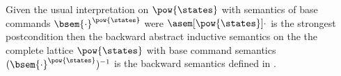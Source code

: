 Given the usual interpretation on $\pow{\states}$ with semantics of base 
commands $\bsem{\cdot}^{\pow{\states}}$ were $\asem[\pow{\states}]{\cdot}$ is the 
strongest postcondition then the backward abstract inductive semantics on the
the complete lattice $\pow{\states}$ with base command semantics 
$(\bsem{\cdot}^{\pow{\states}})^{-1}$ is the backward semantics defined in
\cite{Ascari24}.
